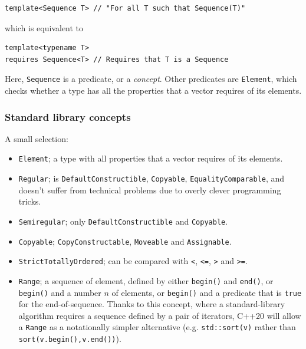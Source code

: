 \documentclass[table, xcdraw]{article}%
\begin{document}
\begin{verbatim}
template<Sequence T> // "For all T such that Sequence(T)"
\end{verbatim}

which is equivalent to

\begin{verbatim}
template<typename T>
requires Sequence<T> // Requires that T is a Sequence
\end{verbatim}

Here, \texttt{Sequence} is a predicate, or a \emph{concept}. Other predicates are \texttt{Element}, which checks whether a type has all the properties that a vector requires of its elements.

\subsubsection{Standard library concepts}

A small selection:
\begin{itemize}
    \item \texttt{Element}; a type with all properties that a vector requires of its elements.
    \item \texttt{Regular}; is \texttt{DefaultConstructible}, \texttt{Copyable}, \texttt{EqualityComparable}, and doesn't suffer from technical problems due to overly clever programming tricks.
    \item \texttt{Semiregular}; only \texttt{DefaultConstructible} and \texttt{Copyable}.
    \item \texttt{Copyable}; \texttt{CopyConstructable}, \texttt{Moveable} and \texttt{Assignable}.
    \item \texttt{StrictTotallyOrdered}; can be compared with \texttt{<}, \texttt{<=}, \texttt{>} and \texttt{>=}.
    \item \texttt{Range}; a sequence of element, defined by either \texttt{begin()} and \texttt{end()}, or \texttt{begin()} and a number $n$ of elements, or \texttt{begin()} and a predicate that is \texttt{true} for the end-of-sequence. Thanks to this concept, where a standard-library algorithm requires a sequence defined by a pair of iterators, C++20 will allow a \texttt{Range} as a notationally simpler alternative (e.g. \texttt{std::sort(v)} rather than \texttt{sort(v.begin(),v.end())}). 
\end{itemize}
\end{document}
